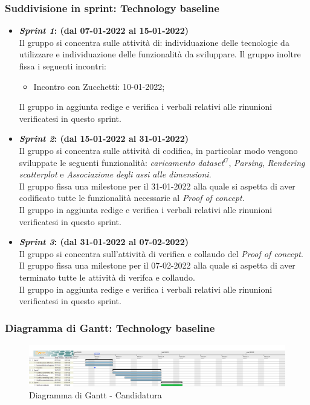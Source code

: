 \subsubsection{Suddivisione in sprint: Technology baseline}
\begin{itemize}
    \item \textbf{\textit{Sprint 1}: (dal 07-01-2022 al 15-01-2022)}\\
    Il gruppo si concentra sulle attività di: individuazione delle tecnologie da utilizzare e individuazione delle funzionalità da sviluppare.
    Il gruppo inoltre fissa i seguenti incontri:
    \begin{itemize}
        \item Incontro con Zucchetti: 10-01-2022;
    \end{itemize}
    Il gruppo in aggiunta redige e verifica i verbali relativi alle rinunioni verificatesi in questo sprint.

    \item \textbf{\textit{Sprint 2}: (dal 15-01-2022 al 31-01-2022)}\\
    Il gruppo si concentra sulle attività di codifica, in particolar modo vengono sviluppate le seguenti funzionalità: \textit{caricamento dataset$^{G}$}, \textit{Parsing}, \textit{Rendering scatterplot} e \textit{Associazione degli assi alle dimensioni}.\\
    Il gruppo fissa una milestone per il 31-01-2022 alla quale si aspetta di aver codificato tutte le funzionalità necessarie al \textit{Proof of concept}.\\
    Il gruppo in aggiunta redige e verifica i verbali relativi alle rinunioni verificatesi in questo sprint.

    \item \textbf{\textit{Sprint 3}: (dal 31-01-2022 al 07-02-2022)}\\
    Il gruppo si concentra sull'attività di verifica e collaudo del \textit{Proof of concept}.\\
    Il gruppo fissa una milestone per il 07-02-2022 alla quale si aspetta di aver terminato tutte le attività di verifca e collaudo.\\
    Il gruppo in aggiunta redige e verifica i verbali relativi alle rinunioni verificatesi in questo sprint.
\end{itemize}

\subsubsection{Diagramma di Gantt: Technology baseline}
\begin{figure}[h!]
    \centering
    \includegraphics[scale=0.22]{../../assets/Diagrammi_Gantt/TB.png}
    \caption{Diagramma di Gantt - Candidatura}
\end{figure}